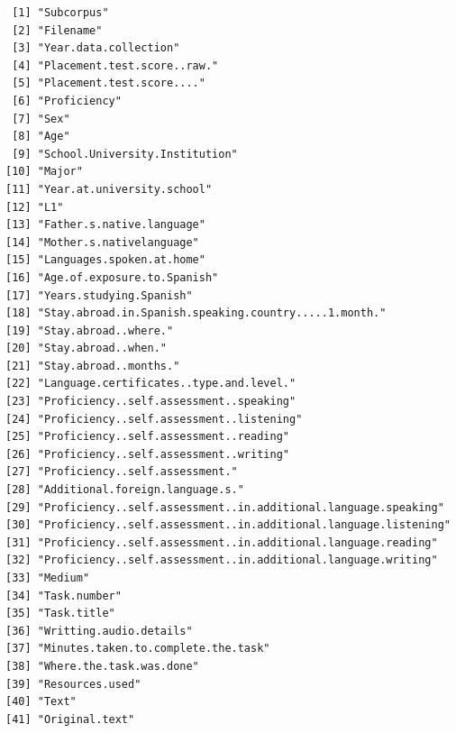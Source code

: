 \documentclass[
  letterpaper,
  DIV=11,
  numbers=noendperiod]{scrartcl}
\begin{document}
\begin{verbatim}
 [1] "Subcorpus"                                                     
 [2] "Filename"                                                      
 [3] "Year.data.collection"                                          
 [4] "Placement.test.score..raw."                                    
 [5] "Placement.test.score...."                                      
 [6] "Proficiency"                                                   
 [7] "Sex"                                                           
 [8] "Age"                                                           
 [9] "School.University.Institution"                                 
[10] "Major"                                                         
[11] "Year.at.university.school"                                     
[12] "L1"                                                            
[13] "Father.s.native.language"                                      
[14] "Mother.s.nativelanguage"                                       
[15] "Languages.spoken.at.home"                                      
[16] "Age.of.exposure.to.Spanish"                                    
[17] "Years.studying.Spanish"                                        
[18] "Stay.abroad.in.Spanish.speaking.country.....1.month."          
[19] "Stay.abroad..where."                                           
[20] "Stay.abroad..when."                                            
[21] "Stay.abroad..months."                                          
[22] "Language.certificates..type.and.level."                        
[23] "Proficiency..self.assessment..speaking"                        
[24] "Proficiency..self.assessment..listening"                       
[25] "Proficiency..self.assessment..reading"                         
[26] "Proficiency..self.assessment..writing"                         
[27] "Proficiency..self.assessment."                                 
[28] "Additional.foreign.language.s."                                
[29] "Proficiency..self.assessment..in.additional.language.speaking" 
[30] "Proficiency..self.assessment..in.additional.language.listening"
[31] "Proficiency..self.assessment..in.additional.language.reading"  
[32] "Proficiency..self.assessment..in.additional.language.writing"  
[33] "Medium"                                                        
[34] "Task.number"                                                   
[35] "Task.title"                                                    
[36] "Writting.audio.details"                                        
[37] "Minutes.taken.to.complete.the.task"                            
[38] "Where.the.task.was.done"                                       
[39] "Resources.used"                                                
[40] "Text"                                                          
[41] "Original.text"                                                 
\end{verbatim}
\end{document}
